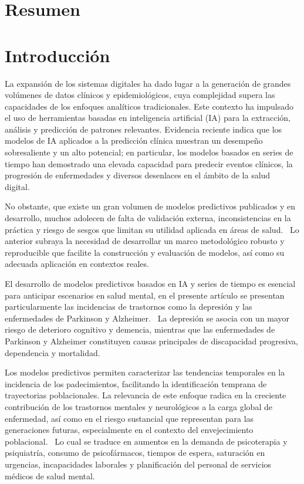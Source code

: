 \documentclass[12pt,a4paper]{article}
\begin{document}
\section*{Resumen}


\section*{Introducción}

La expansión de los sistemas digitales ha dado lugar a la generación de grandes volúmenes de datos clínicos y epidemiológicos, cuya complejidad supera las capacidades de los enfoques analíticos tradicionales. Este contexto ha impulsado el uso de herramientas basadas en inteligencia artificial (IA) para la extracción, análisis y predicción de patrones relevantes. Evidencia reciente indica que los modelos de IA aplicados a la predicción clínica muestran un desempeño sobresaliente y un alto potencial; en particular, los modelos basados en series de tiempo han demostrado una elevada capacidad para predecir eventos clínicos, la progresión de enfermedades y diversos desenlaces en el ámbito de la salud digital.~\cite{harutyunyan2019,shickel2018}

No obstante, que existe un gran volumen de modelos predictivos publicados y en desarrollo, muchos adolecen de falta de validación externa, inconsistencias en la práctica y riesgo de sesgos que limitan su utilidad aplicada en áreas de salud.~\cite{abdulazeem2023} Lo anterior subraya la necesidad de desarrollar un marco metodológico robusto y reproducible que facilite la construcción y evaluación de modelos, así como su adecuada aplicación en contextos reales.

El desarrollo de modelos predictivos basados en IA y series de tiempo es esencial para anticipar escenarios en salud mental, en el presente artículo se presentan particularmente las incidencias de trastornos como la depresión y las enfermedades de Parkinson y Alzheimer.~\cite{livingston2020} La depresión se asocia con un mayor riesgo de deterioro cognitivo y demencia, mientras que las enfermedades de Parkinson y Alzheimer constituyen causas principales de discapacidad progresiva, dependencia y mortalidad.~\cite{nickson2023,tabashum2024,aslan2025}

Los modelos predictivos permiten caracterizar las tendencias temporales en la incidencia de los padecimientos, facilitando la identificación temprana de trayectorias poblacionales. La relevancia de este enfoque radica en la creciente contribución de los trastornos mentales y neurológicos a la carga global de enfermedad, así como en el riesgo sustancial que representan para las generaciones futuras, especialmente en el contexto del envejecimiento poblacional.~\cite{shatte2019} Lo cual se traduce en aumentos en la demanda de psicoterapia y psiquiatría, consumo de psicofármacos, tiempos de espera, saturación en urgencias, incapacidades laborales y planificación del personal de servicios médicos de salud mental.
\end{document}
